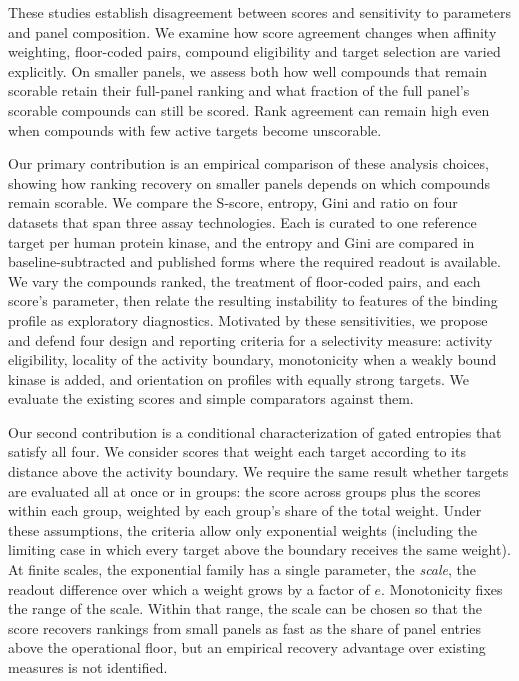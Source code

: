 These studies establish disagreement between scores and sensitivity to
parameters and panel composition. We examine how score agreement changes
when affinity weighting, floor-coded pairs, compound eligibility and target
selection are varied explicitly. On smaller panels, we assess both how well
compounds that remain scorable retain their full-panel ranking and what
fraction of the full panel's scorable compounds can still be scored.
Rank agreement can remain high even when compounds with few active targets
become unscorable.

Our primary contribution is an empirical comparison of these analysis choices,
showing how ranking recovery on smaller panels depends on which compounds
remain scorable. We compare
the S-score, entropy, Gini and ratio on four datasets that span three assay technologies.
Each is curated to one reference target per human protein kinase, and the
entropy and Gini are compared in baseline-subtracted and published forms
where the required readout is available. We vary the compounds ranked, the treatment of
floor-coded pairs, and each score's parameter, then relate the
resulting instability to features of the binding profile as exploratory
diagnostics. Motivated by these sensitivities, we propose and defend four design and
reporting criteria for a selectivity measure: activity eligibility,
locality of the activity boundary, monotonicity when a weakly bound kinase is
added, and orientation on profiles with equally strong targets. We evaluate
the existing scores and simple comparators against them.

Our second contribution
is a conditional characterization of gated entropies that satisfy all four.
We consider scores that weight each target according to its distance above
the activity boundary. We require the same result whether targets are
evaluated all at once or in groups: the score across groups plus the scores
within each group, weighted by each group's share of the total weight.
Under these assumptions, the criteria allow only exponential weights (including the limiting case
in which every target above the boundary receives the same weight). At finite
scales, the exponential family has a single parameter, the
\emph{scale}, the readout difference over which a weight grows by a factor
of $e$. Monotonicity fixes the range of the scale. Within that range, the
scale can be chosen so that the score recovers rankings from small panels as
fast as the share of panel entries above the operational floor, but
an empirical recovery advantage over existing measures is not identified.

